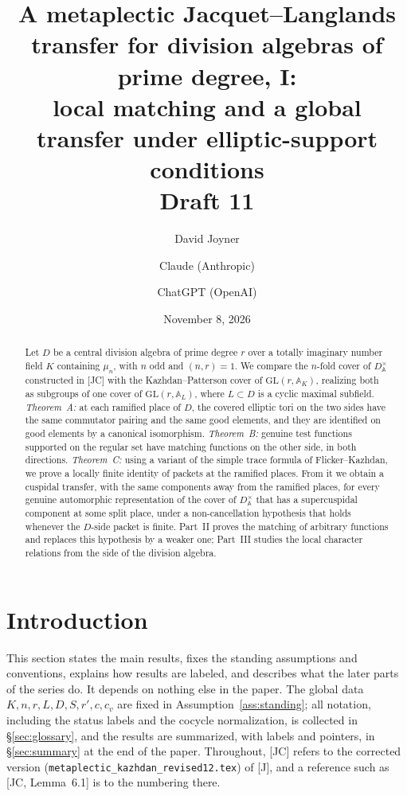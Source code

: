 \documentclass[12pt]{article}
\title{A metaplectic Jacquet--Langlands transfer for division algebras of prime degree, I:\\ local matching and a global transfer under elliptic-support conditions\\[0.4em]\normalsize Draft 11}
\author{David Joyner \and Claude (Anthropic) \and ChatGPT (OpenAI)}
\date{November 8, 2026}
\newcommand{\A}{\mathbb{A}}
\newcommand{\GL}{\mathrm{GL}}
\theoremstyle{plain}
\theoremstyle{definition}
\begin{document}
\maketitle

\begin{abstract}
Let $D$ be a central division algebra of prime degree $r$ over a totally imaginary number field $K$ containing $\mu_n$, with $n$ odd and $(n,r)=1$. We compare the $n$-fold cover of $D^\times_{\A}$ constructed in [JC] with the Kazhdan--Patterson cover of $\GL(r,\A_K)$, realizing both as subgroups of one cover of $\GL(r,\A_L)$, where $L\subset D$ is a cyclic maximal subfield. \emph{Theorem~A:} at each ramified place of $D$, the covered elliptic tori on the two sides have the same commutator pairing and the same good elements, and they are identified on good elements by a canonical isomorphism. \emph{Theorem~B:} genuine test functions supported on the regular set have matching functions on the other side, in both directions. \emph{Theorem~C:} using a variant of the simple trace formula of Flicker--Kazhdan, we prove a locally finite identity of packets at the ramified places. From it we obtain a cuspidal transfer, with the same components away from the ramified places, for every genuine automorphic representation of the cover of $D^\times_{\A}$ that has a supercuspidal component at some split place, under a non-cancellation hypothesis that holds whenever the $D$-side packet is finite. Part~II proves the matching of arbitrary functions and replaces this hypothesis by a weaker one; Part~III studies the local character relations from the side of the division algebra.
\end{abstract}

\tableofcontents

\section{Introduction}\label{sec:intro}
This section states the main results, fixes the standing assumptions and conventions, explains how results are labeled, and describes what the later parts of the series do. It depends on nothing else in the paper. The global data $K,n,r,L,D,S,r',c,c_v$ are fixed in Assumption~\ref{ass:standing}; all notation, including the status labels and the cocycle normalization, is collected in \S\ref{sec:glossary}, and the results are summarized, with labels and pointers, in \S\ref{sec:summary} at the end of the paper. Throughout, [JC] refers to the corrected version (\texttt{metaplectic\_kazhdan\_revised12.tex}) of [J], and a reference such as [JC, Lemma~6.1] is to the numbering there.
\end{document}
